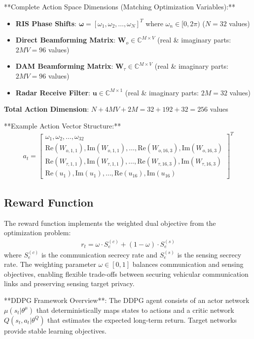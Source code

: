 \documentclass[journal]{IEEEtran}
\begin{document}
**Complete Action Space Dimensions (Matching Optimization Variables):**
\begin{itemize}
\item \textbf{RIS Phase Shifts}: $\boldsymbol{\omega} = [\omega_1, \omega_2, \ldots, \omega_N]^T$ where $\omega_n \in [0, 2\pi)$ ($N = 32$ values)
\item \textbf{Direct Beamforming Matrix}: $\mathbf{W}_{o} \in \mathbb{C}^{M \times V}$ (real \& imaginary parts: $2MV = 96$ values)
\item \textbf{DAM Beamforming Matrix}: $\mathbf{W}_{\tau} \in \mathbb{C}^{M \times V}$ (real \& imaginary parts: $2MV = 96$ values)
\item \textbf{Radar Receive Filter}: $\mathbf{u} \in \mathbb{C}^{M \times 1}$ (real \& imaginary parts: $2M = 32$ values)
\end{itemize}
\textbf{Total Action Dimension}: $N + 4MV + 2M = 32 + 192 + 32 = 256$ values

**Example Action Vector Structure:**
\begin{align}
a_t = \begin{bmatrix}
\omega_1, \omega_2, \ldots, \omega_{32} \\
\text{Re}(W_{o,1,1}), \text{Im}(W_{o,1,1}), \ldots, \text{Re}(W_{o,16,3}), \text{Im}(W_{o,16,3}) \\
\text{Re}(W_{\tau,1,1}), \text{Im}(W_{\tau,1,1}), \ldots, \text{Re}(W_{\tau,16,3}), \text{Im}(W_{\tau,16,3}) \\
\text{Re}(u_1), \text{Im}(u_1), \ldots, \text{Re}(u_{16}), \text{Im}(u_{16})
\end{bmatrix}^T
\end{align}

\subsection{Reward Function}

The reward function implements the weighted dual objective from the optimization problem:
\begin{align}
r_t = \omega \cdot S^{(c)}_e + (1-\omega) \cdot S^{(s)}_e
\end{align}
where $S^{(c)}_e$ is the communication secrecy rate and $S^{(s)}_e$ is the sensing secrecy rate. The weighting parameter $\omega \in [0,1]$ balances communication and sensing objectives, enabling flexible trade-offs between securing vehicular communication links and preserving sensing target privacy.

**DDPG Framework Overview**: The DDPG agent consists of an actor network $\mu(s_t | \theta^{\mu})$ that deterministically maps states to actions and a critic network $Q(s_t, a_t | \theta^Q)$ that estimates the expected long-term return. Target networks provide stable learning objectives.
\end{document}
